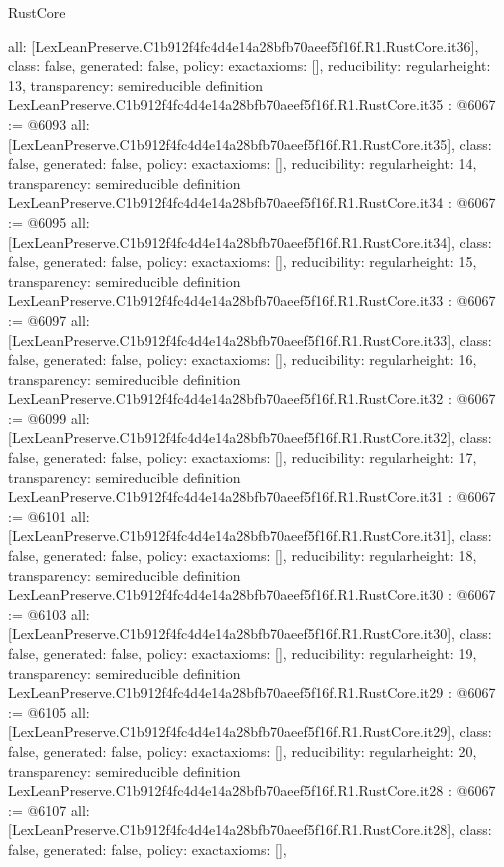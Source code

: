 \begin{lexlean}{RustCore}
\begin{coremodule}
{  all: [LexLeanPreserve.C1b912f4fc4d4e14a28bfb70aeef5f16f.R1.RustCore.it36],
  class: false,
  generated: false,
  policy: exact{axioms: []},
  reducibility: regular{height: 13},
  transparency: semireducible
}
definition LexLeanPreserve.C1b912f4fc4d4e14a28bfb70aeef5f16f.R1.RustCore.it35 : @6067 := @6093 {
  all: [LexLeanPreserve.C1b912f4fc4d4e14a28bfb70aeef5f16f.R1.RustCore.it35],
  class: false,
  generated: false,
  policy: exact{axioms: []},
  reducibility: regular{height: 14},
  transparency: semireducible
}
definition LexLeanPreserve.C1b912f4fc4d4e14a28bfb70aeef5f16f.R1.RustCore.it34 : @6067 := @6095 {
  all: [LexLeanPreserve.C1b912f4fc4d4e14a28bfb70aeef5f16f.R1.RustCore.it34],
  class: false,
  generated: false,
  policy: exact{axioms: []},
  reducibility: regular{height: 15},
  transparency: semireducible
}
definition LexLeanPreserve.C1b912f4fc4d4e14a28bfb70aeef5f16f.R1.RustCore.it33 : @6067 := @6097 {
  all: [LexLeanPreserve.C1b912f4fc4d4e14a28bfb70aeef5f16f.R1.RustCore.it33],
  class: false,
  generated: false,
  policy: exact{axioms: []},
  reducibility: regular{height: 16},
  transparency: semireducible
}
definition LexLeanPreserve.C1b912f4fc4d4e14a28bfb70aeef5f16f.R1.RustCore.it32 : @6067 := @6099 {
  all: [LexLeanPreserve.C1b912f4fc4d4e14a28bfb70aeef5f16f.R1.RustCore.it32],
  class: false,
  generated: false,
  policy: exact{axioms: []},
  reducibility: regular{height: 17},
  transparency: semireducible
}
definition LexLeanPreserve.C1b912f4fc4d4e14a28bfb70aeef5f16f.R1.RustCore.it31 : @6067 := @6101 {
  all: [LexLeanPreserve.C1b912f4fc4d4e14a28bfb70aeef5f16f.R1.RustCore.it31],
  class: false,
  generated: false,
  policy: exact{axioms: []},
  reducibility: regular{height: 18},
  transparency: semireducible
}
definition LexLeanPreserve.C1b912f4fc4d4e14a28bfb70aeef5f16f.R1.RustCore.it30 : @6067 := @6103 {
  all: [LexLeanPreserve.C1b912f4fc4d4e14a28bfb70aeef5f16f.R1.RustCore.it30],
  class: false,
  generated: false,
  policy: exact{axioms: []},
  reducibility: regular{height: 19},
  transparency: semireducible
}
definition LexLeanPreserve.C1b912f4fc4d4e14a28bfb70aeef5f16f.R1.RustCore.it29 : @6067 := @6105 {
  all: [LexLeanPreserve.C1b912f4fc4d4e14a28bfb70aeef5f16f.R1.RustCore.it29],
  class: false,
  generated: false,
  policy: exact{axioms: []},
  reducibility: regular{height: 20},
  transparency: semireducible
}
definition LexLeanPreserve.C1b912f4fc4d4e14a28bfb70aeef5f16f.R1.RustCore.it28 : @6067 := @6107 {
  all: [LexLeanPreserve.C1b912f4fc4d4e14a28bfb70aeef5f16f.R1.RustCore.it28],
  class: false,
  generated: false,
  policy: exact{axioms: []},
}
\end{coremodule}
\end{lexlean}
